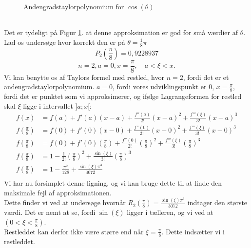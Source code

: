 \documentclass[12pt, a4paper]{article}
\begin{document}
\begin{refsection}
\begin{figure}[h!]
     \caption{Andengradstaylorpolynomium for $\cos(\theta)$}
     \label{fig:cosinusanden}
\end{figure}\\
Det er tydeligt på Figur \ref{fig:cosinusanden}. at denne approksimation er god for små værdier af $\theta$. Lad os undersøge hvor korrekt den er på $\theta=\frac{1}{8}\pi$
\begin{equation*}
    P_2\left(\frac{\pi}{8}\right)=0{,}9228937
\end{equation*}
\[
n=2, a=0, x=\frac{\pi}{8}, \quad a<\xi<x
.\] 
Vi kan benytte os af Taylors formel med restled, hvor $n=2$, fordi det er et andengradstaylorpolynomium.  $a=0$, fordi vores udviklingspunkt er 0,  $x=\frac{\pi}{8}$, fordi det er punktet som vi approksimerer, og ifølge Lagrangeformen for restled skal $\xi$ ligge i intervallet $]a;x[$:
\begin{equation*}
    \begin{aligned}
    f(x)&=f(a)+f'(a)(x-a)+\frac{f''(a)}{2!}(x-a)^2+\frac{f'''(\xi)}{3!}(x-a)^3\\
    f\left(\frac{\pi}{8}\right)&=f(0)+f'(0)(x-0)+\frac{f''(0)}{2!}(x-0)^2+\frac{f'''(\xi)}{3!}(x-0)^3\\
    f\left(\frac{\pi}{8}\right)&=f(0)+f'(0)\left(\frac{\pi}{8}\right)+\frac{f''(0)}{2!}\left(\frac{\pi}{8}\right)^2+\frac{f'''(\xi)}{3!}\left(\frac{\pi}{8}\right)^3\\
    f\left(\frac{\pi}{8}\right)&=1-\frac{1}{2!}\left(\frac{\pi}{8}\right)^2+\frac{\sin(\xi)}{3!}\left(\frac{\pi}{8}\right)^3\\
    f\left(\frac{\pi}{8}\right)&=1-\frac{\pi^2}{128}+\frac{\sin(\xi)\pi^3}{3072}\\
    \end{aligned}
\end{equation*}
Vi har nu forsimplet denne ligning, og vi kan bruge dette til at finde den maksimale fejl af approksimationen.\\
Dette finder vi ved at undersøge hvornår $R_2\left(\frac{\pi}{8}\right)=\frac{\sin(\xi)\pi^3}{3072}$ indtager den største værdi. Det er nemt at se, fordi $\sin(\xi)$ ligger i tælleren, og vi ved at  $(0<\xi<\frac{\pi}{8})$.\\
Restleddet kan derfor ikke være større end når $\xi=\frac{\pi}{8}$. Dette indsætter vi i restleddet.

\end{refsection}
\end{document}
